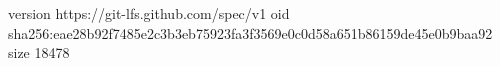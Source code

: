 version https://git-lfs.github.com/spec/v1
oid sha256:eae28b92f7485e2c3b3eb75923fa3f3569e0c0d58a651b86159de45e0b9baa92
size 18478
